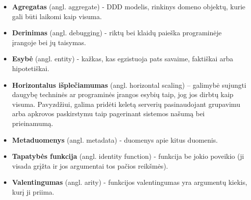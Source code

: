 \begin{itemize}

	\item \textbf{Agregatas} (angl. aggregate) - DDD modelis, rinkinys domeno objektų, kurie gali būti laikomi kaip visuma.

	\item \textbf{Derinimas} (angl. debugging) - riktų bei klaidų paieška programinėje įrangoje bei jų taisymas.

	\item \textbf{Esybė} (angl. entity) - kažkas, kas egzistuoja pats savaime, faktiškai arba hipotetiškai.

	\item \textbf{Horizontalus išplečiamumas} (angl. horizontal scaling) – galimybė sujungti daugybę techninės ar programinės įrangos esybių taip, jog jos dirbtų kaip visuma. Pavyzdžiui, galima pridėti keletą serverių pasinaudojant grupavimu arba apkrovos paskirstymu taip pagerinant sistemos našumą bei prieinamumą.

	\item \textbf{Metaduomenys} (angl. metadata) - duomenys apie kitus duomenis.

	\item \textbf{Tapatybės funkcija} (angl. identity function) - funkcija be jokio poveikio (ji visada grįžta ir jos argumentai tos pačios reikšmės).

	\item \textbf{Valentingumas} (angl. arity) - funkcijos valentingumas yra argumentų kiekis, kurį ji priima.

\end{itemize}
